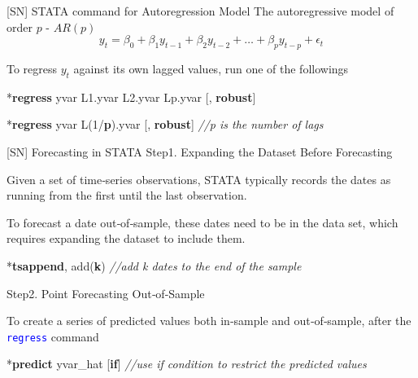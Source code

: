 \documentclass[
  10pt,
  ignorenonframetext,
]{beamer}
\newenvironment{Shaded}{\begin{snugshade}}{\end{snugshade}}
\newcommand{\CommentTok}[1]{\textcolor[rgb]{0.56,0.35,0.01}{\textit{#1}}}
\newcommand{\KeywordTok}[1]{\textcolor[rgb]{0.13,0.29,0.53}{\textbf{#1}}}
\newcommand{\NormalTok}[1]{#1}
\begin{document}
\begin{frame}[fragile]{{[}SN{]} STATA command for Autoregression Model}
\protect\hypertarget{ARmodel}{}
The autoregressive model of order \(p\) - \(AR(p)\) \[
y_t = \beta_0 + \beta_1 y_{t-1} + \beta_2 y_{t-2} + \ldots + \beta_p y_{t-p} + \epsilon_t
\]

To regress \(y_t\) against its own lagged values, run one of the
followings \small

\begin{Shaded}
\begin{Highlighting}[]
\NormalTok{*}\KeywordTok{regress}\NormalTok{ yvar L1.yvar L2.yvar Lp.yvar [, }\KeywordTok{robust}\NormalTok{]}
\end{Highlighting}
\end{Shaded}

\begin{Shaded}
\begin{Highlighting}[]
\NormalTok{*}\KeywordTok{regress}\NormalTok{ yvar L(1/}\KeywordTok{p}\NormalTok{).yvar [, }\KeywordTok{robust}\NormalTok{]}
\CommentTok{//\textquotesingle{}p\textquotesingle{} is the number of lags}
\end{Highlighting}
\end{Shaded}
\end{frame}

\begin{frame}[fragile]{{[}SN{]} Forecasting in STATA}
\protect\hypertarget{sn-forecasting-in-stata}{}
Step1. Expanding the Dataset Before Forecasting

\small

Given a set of time‐series observations, STATA typically records the
dates as running from the first until the last observation.

To forecast a date out‐of‐sample, these dates need to be in the data
set, which requires expanding the dataset to include them.

\begin{Shaded}
\begin{Highlighting}[]
\NormalTok{*}\KeywordTok{tsappend}\NormalTok{, add(}\KeywordTok{k}\NormalTok{)}
\CommentTok{//add \textquotesingle{}k\textquotesingle{} dates to the end of the sample}
\end{Highlighting}
\end{Shaded}

\normalsize

Step2. Point Forecasting Out‐of‐Sample

\small

To create a series of predicted values both in‐sample and out‐of‐sample,
after the \textcolor{blue}{\texttt{regress}} command\small

\begin{Shaded}
\begin{Highlighting}[]
\NormalTok{*}\KeywordTok{predict}\NormalTok{ yvar\_hat [}\KeywordTok{if}\NormalTok{]}
\CommentTok{//use \textquotesingle{}if\textquotesingle{} condition to restrict the predicted values}
\end{Highlighting}
\end{Shaded}
\end{frame}
\end{document}
